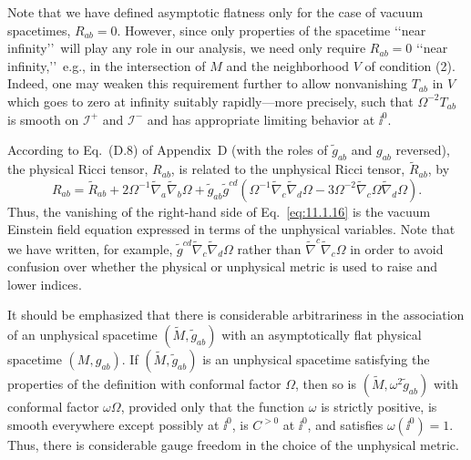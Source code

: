 Note that we have defined asymptotic flatness only for the case of vacuum
spacetimes, \(R_{ab}=0\). However, since only properties of the spacetime \lq\lq near
infinity\rq\rq\ will play any role in our analysis, we need only require \(R_{ab}=0\)
\lq\lq near infinity,\rq\rq\ e.g., in the intersection of \(M\) and the neighborhood
\(V\) of condition (2). Indeed, one may weaken this requirement further to allow
nonvanishing \(T_{ab}\) in \(V\) which goes to zero at infinity suitably
rapidly---more precisely, such that \(\Omega^{-2}T_{ab}\) is smooth on
\(\mathcal I^+\) and \(\mathcal I^-\) and has appropriate limiting behavior at \(\ii^0\).

According to Eq.~(D.8) of Appendix~D (with the roles of \(\tilde g_{ab}\) and
\(g_{ab}\) reversed), the physical Ricci tensor, \(R_{ab}\), is related to the
unphysical Ricci tensor, \(\tilde R_{ab}\), by
\begin{equation}
  R_{ab}=\tilde R_{ab}+2\Omega^{-1}\tilde\nabla_a\tilde\nabla_b\Omega
  +\tilde g_{ab}\tilde g^{cd}
  \left(\Omega^{-1}\tilde\nabla_c\tilde\nabla_d\Omega
  -3\Omega^{-2}\tilde\nabla_c\Omega\tilde\nabla_d\Omega\right).
  \tag{11.1.16}\label{eq:11.1.16}
\end{equation}
Thus, the vanishing of the right-hand side of Eq.~\eqref{eq:11.1.16} is the vacuum
Einstein field equation expressed in terms of the unphysical variables. Note that we
have written, for example, \(\tilde g^{cd}\tilde\nabla_c\tilde\nabla_d\Omega\) rather
than \(\tilde\nabla^c\tilde\nabla_c\Omega\) in order to avoid confusion over whether
the physical or unphysical metric is used to raise and lower indices.

It should be emphasized that there is considerable arbitrariness in the association
of an unphysical spacetime \((\tilde M,\tilde g_{ab})\) with an asymptotically flat
physical spacetime \((M,g_{ab})\). If \((\tilde M,\tilde g_{ab})\) is an unphysical
spacetime satisfying the properties of the definition with conformal factor
\(\Omega\), then so is \((\tilde M,\omega^2\tilde g_{ab})\) with conformal factor
\(\omega\Omega\), provided only that the function \(\omega\) is strictly positive, is
smooth everywhere except possibly at \(\ii^0\), is \(C^{>0}\) at \(\ii^0\), and satisfies
\(\omega(\ii^0)=1\). Thus, there is considerable gauge freedom in the choice of the
unphysical metric.

